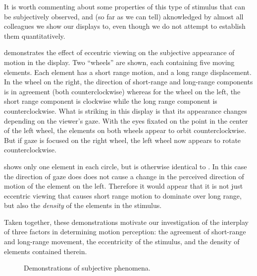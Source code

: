 \documentclass[english,jou]{article}
\begin{document}
It is worth commenting about some properties of this type of stimulus
that can be subjectively observed, and (so far as we can tell) aknowledged
by almost all colleagues we show our displays to, even though we do
not attempt to establish them quantitatively.

 demonstrates the effect of eccentric viewing
on the subjective appearance of motion in the display. Two ``wheels''
are shown, each containing five moving elements. Each element has
a short range motion, and a long range displacement. In the wheel
on the right, the direction of short-range and long-range components
is in agreement (both counterclockwise) whereas for the wheel on the
left, the short range component is clockwise while the long range
component is counterclockwise. What is striking in this display is
that its appearance changes depending on the viewer's gaze. With the
eyes fixated on the point in the center of the left wheel, the elements
on both wheels appear to orbit counterclockwise. But if gaze is focused
on the right wheel, the left wheel now appears to rotate counterclockwise. 

 shows only one element in each circle, but
is otherwise identical to . In this case the
direction of gaze does does not cause a change in the perceived direction
of motion of the element on the left. Therefore it would appear that
it is not just eccentric viewing that causes short range motion to
dominate over long range, but also the \emph{density} of the elements
in the stimulus.

Taken together, these demonstrations motivate our investigation of
the interplay of three factors in determining motion perception: the
agreement of short-range and long-range movement, the eccentricity
of the stimulus, and the density of elements contained therein.

\begin{figure}


\caption{\label{fig:wheels}Demonstrations of subjective phenomena.}
\end{figure}
\end{document}
